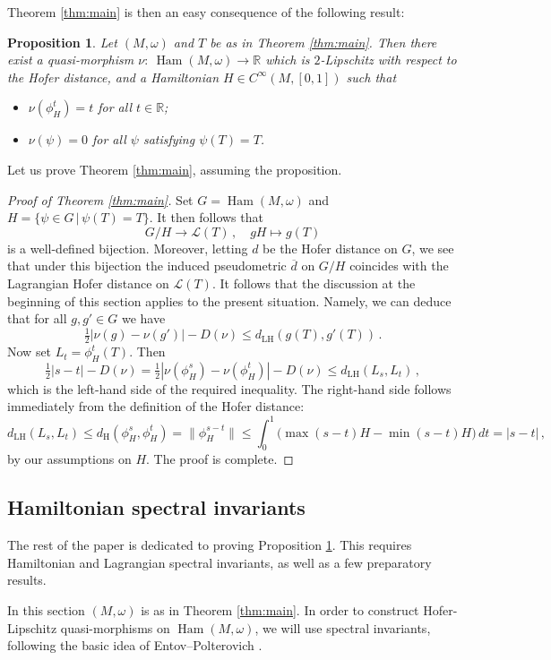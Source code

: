 \documentclass[11pt%
]{article}
\newtheorem{prop}[thm]{Proposition}
\theoremstyle{definition}
\newcommand{\R}{{\mathbb{R}}}
\newcommand{\cL}{{\mathcal{L}}}
\newcommand{\fc}{{:\ }}
\newcommand{\ol}{\overline}
\DeclareMathOperator{\Ham}{Ham}
\DeclareMathOperator{\0}{\operatorname{\mathbf{0}}}
\begin{document}
Theorem \ref{thm:main} is then an easy consequence of the following result:
\begin{prop}\label{prop:qm}
  Let $(M,\omega)$ and $T$ be as in Theorem \ref{thm:main}. Then there exist a quasi-morphism $\nu \fc \Ham(M,\omega)\to \R$ which is $2$-Lipschitz with respect to the Hofer distance, and a Hamiltonian $H \in C^\infty(M,[0,1])$ such that
  \begin{itemize}
    \item $\nu(\phi^t_H) = t$ for all $t\in\R$;
    \item $\nu(\psi)=0$ for all $\psi$ satisfying $\psi(T) = T$.
  \end{itemize}
\end{prop}
\noindent Let us prove Theorem \ref{thm:main}, assuming the proposition.
\begin{proof}[Proof of Theorem \ref{thm:main}]
  Set $G = \Ham(M,\omega)$ and $H = \{\psi \in G\,|\,\psi(T) = T\}$. It then follows that
  $$G/H \to \cL(T)\,,\quad gH\mapsto g(T)$$
  is a well-defined bijection. Moreover, letting $d$ be the Hofer distance on $G$, we see that under this bijection the induced pseudometric $\ol d$ on $G/H$ coincides with the Lagrangian Hofer distance on $\cL(T)$. It follows that the discussion at the beginning of this section applies to the present situation. Namely, we can deduce that for all $g,g' \in G$ we have
  $$\tfrac12|\nu(g) - \nu(g')| - D(\nu) \leq d_{\mathrm{LH}}(g(T),g'(T))\,.$$
  Now set $L_t=\phi^t_H(T)$. Then
  $$\tfrac 12|s-t| - D(\nu) = \tfrac12|\nu(\phi^s_H) - \nu(\phi^t_H)| - D(\nu) \leq d_{\mathrm{LH}}(L_s,L_t)\,,$$
  which is the left-hand side of the required inequality. The right-hand side follows immediately from the definition of the Hofer distance:
  $$d_{\mathrm{LH}}(L_s,L_t) \leq d_{\mathrm{H}}(\phi^s_H,\phi^t_H) = \|\phi^{s-t}_H\| \leq \int_0^1\big(\max (s-t)H - \min (s-t) H\big)\,dt = |s-t|\,,$$
  by our assumptions on $H$. The proof is complete.
\end{proof}


\subsection{Hamiltonian spectral invariants}

The rest of the paper is dedicated to proving Proposition \ref{prop:qm}. This requires Hamiltonian and Lagrangian spectral invariants, as well as a few preparatory results.

In this section $(M,\omega)$ is as in Theorem \ref{thm:main}. In order to construct Hofer-Lipschitz quasi-morphisms on $\Ham(M,\omega)$, we will use spectral invariants, following the basic idea of Entov--Polterovich \cite{Entov_Polterovich_Calabi_QM_QH}.
\end{document}
